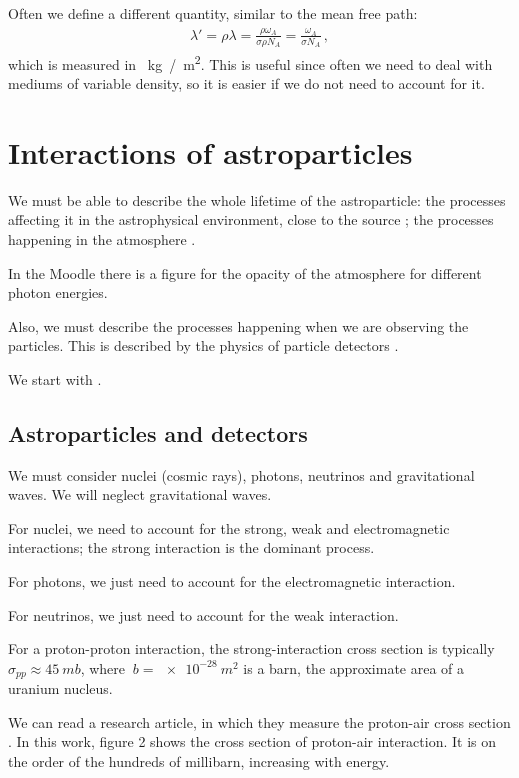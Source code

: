 \documentclass[main.tex]{subfiles}
\begin{document}
Often we define a different quantity, similar to the mean free path: 
%
\begin{align}
\lambda' =\rho \lambda = \frac{\rho \omega_{A} }{\sigma \rho  N_A}= \frac{\omega_{A} }{\sigma  N_A}
\,,
\end{align}
%
which is measured in \SI{}{kg /m^2}. This is useful since often we need to deal with mediums of variable density, so it is easier if we do not need to account for it.

\section{Interactions of astroparticles}


We must be able to describe the whole lifetime of the astroparticle: the processes affecting it in the astrophysical environment, close to the source ; the processes happening in the atmosphere . 

In the Moodle there is a figure for the opacity of the atmosphere for different photon energies. 

Also, we must describe the processes happening when we are observing the particles. This is described by the physics of particle detectors .

We start with .

\subsection{Astroparticles and detectors}

We must consider nuclei (cosmic rays), photons, neutrinos and gravitational waves. 
We will neglect gravitational waves. 

For nuclei, we need to account for the strong, weak and electromagnetic interactions; the strong interaction is the dominant process.  

For photons, we just need to account for the electromagnetic interaction. 

For neutrinos, we just need to account for the weak interaction.

For a proton-proton interaction, the strong-interaction cross section is typically \(\sigma_{pp} \approx \SI{45}{mb}\), where \(\SI{}{b} = \SI{e-28}{m^2}\) is a barn, the approximate area of a uranium nucleus.

We can read a research article, in which they measure the proton-air cross section \cite[]{pierreaugercollaborationMeasurementProtonairCrosssection2012}.
In this work, figure 2 shows the cross section of proton-air interaction. It is on the order of the hundreds of millibarn, increasing with energy.
\end{document}
